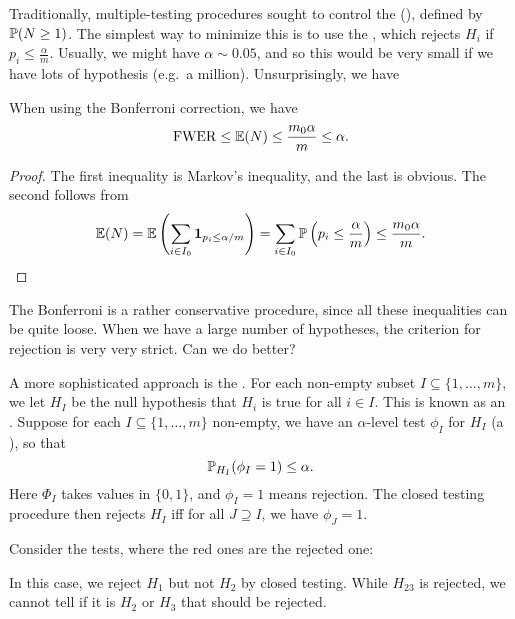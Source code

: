 \documentclass[a4paper]{article}
\begin{document}
Traditionally, multiple-testing procedures sought to control the  (), defined by $\P(N \geq 1)$. The simplest way to minimize this is to use the , which rejects $H_i$ if $p_i \leq \frac{\alpha}{m}$. Usually, we might have $\alpha \sim 0.05$, and so this would be very small if we have lots of hypothesis (e.g.\ a million). Unsurprisingly, we have
\begin{thm}
  When using the Bonferroni correction, we have
  \[
    \mathrm{FWER} \leq \E(N) \leq \frac{m_0 \alpha}{m} \leq \alpha.
  \]
\end{thm}

\begin{proof}
  The first inequality is Markov's inequality, and the last is obvious. The second follows from
  \[
    \E(N) = \E \left(\sum_{i \in I_0} \mathbf{1}_{p_i \leq \alpha/m}\right) = \sum_{i \in I_0} \P\left(p_i \leq \frac{\alpha}{m}\right) \leq \frac{m_0 \alpha}{m}.\qedhere
  \]
\end{proof}
The Bonferroni is a rather conservative procedure, since all these inequalities can be quite loose. When we have a large number of hypotheses, the criterion for rejection is very very strict. Can we do better?

A more sophisticated approach is the . For each non-empty subset $I \subseteq \{1, \ldots, m\}$, we let $H_I$ be the null hypothesis that $H_i$ is true for all $i \in I$. This is known as an . Suppose for each $I \subseteq \{1, \ldots, m\}$ non-empty, we have an $\alpha$-level test $\phi_I$ for $H_I$ (a ), so that
\[
  \P_{H_I}(\phi_I = 1) \leq \alpha.
\]
Here $\Phi_I$ takes values in $\{0, 1\}$, and $\phi_I = 1$ means rejection. The closed testing procedure then rejects $H_I$ iff for all $J \supseteq I$, we have $\phi_J = 1$.

\begin{eg}
  Consider the tests, where the red ones are the rejected one:
  \begin{center}
  \end{center}
  In this case, we reject $H_1$ but not $H_2$ by closed testing. While $H_{23}$ is rejected, we cannot tell if it is $H_2$ or $H_3$ that should be rejected.
\end{eg}
\end{document}
